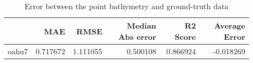 \begin{table}[h!]
\caption{Error between the point bathymetry and ground-truth data}
\label{tab:oahu7_lidar_error}
\begin{tabular}{lrrrrr}
\toprule
 & MAE & RMSE & Median Abs error & R2 Score & Average Error \\
\midrule
oahu7 & 0.717672 & 1.111055 & 0.500108 & 0.866924 & -0.018269 \\
\bottomrule
\end{tabular}
\end{table}
